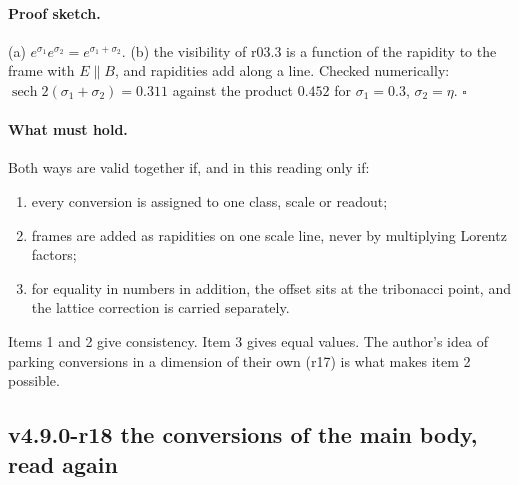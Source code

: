 \paragraph{Proof sketch.}
(a) \(e^{\sigma_1}e^{\sigma_2}=e^{\sigma_1+\sigma_2}\).  (b) the visibility of r03.3 is a function of the rapidity to the frame
with \(E\parallel B\), and rapidities add along a line.  Checked numerically: \(\operatorname{sech}2(\sigma_1+\sigma_2)=0.311\) against
the product \(0.452\) for \(\sigma_1=0.3\), \(\sigma_2=\eta\).  \(\square\)

\paragraph{What must hold.}
Both ways are valid together if, and in this reading only if:
\begin{enumerate}[leftmargin=2em]
\item every conversion is assigned to one class, scale or readout;
\item frames are added as rapidities on one scale line, never by multiplying Lorentz factors;
\item for equality in numbers in addition, the offset sits at the tribonacci point, and the lattice correction is carried
separately.
\end{enumerate}
Items 1 and 2 give consistency.  Item 3 gives equal values.  The author's idea of parking conversions in a dimension of their own
(r17) is what makes item 2 possible.

\subsection*{v4.9.0-r18 the conversions of the main body, read again}
\label{subsec:v490-r18-main-body}

